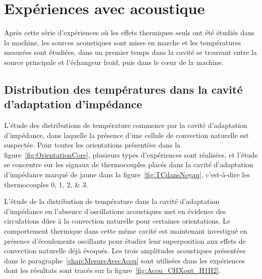 \section{Expériences avec acoustique}\label{chap:DistribTemperature}
Après cette série d'expériences où les effets thermiques seuls ont été étudiés dans la machine, les sources acoustiques sont mises en marche et les températures mesurées sont étudiées, dans un premier temps dans la cavité se trouvant entre la source principale et l'échangeur froid, puis dans le c\oe{}ur de la machine.

\subsection{Distribution des températures dans la cavité d'adaptation d'impédance}\label{chap:DistribTemp_CavAdaptImped}
L'étude des distributions de température commence par la cavité d'adaptation d'impédance, dans laquelle la présence d'une cellule de convection naturelle est suspectée. Pour toutes les orientations présentées dans la figure~\ref{fig:OrientationCore}, plusieurs types d'expériences sont réalisées, et l'étude se concentre sur les signaux de thermocouples placés dans la cavité d'adaptation d'impédance marqué de jaune dans la figure~\ref{fig:TCdansNoyau}, c'est-à-dire les thermocouples \numlist{0;1;2;3}. 




L'étude de la distribution de température dans la cavité d'adaptation d'impédance en l'absence d'oscillations acoustiques met en évidence des circulations dûes à la convection naturelle pour certaines orientations. Le comportement thermique dans cette même cavité est maintenant investigué en présence d'écoulements oscillants pour étudier leur superposition aux effets de convection naturelle déjà évoqués. Les trois amplitudes acoustiques présentées dans le paragraphe~\ref{chap:MesureAvecAcou} sont utilisées dans les expériences dont les résultats sont tracés sur la figure~\ref{fig:Acou_CHXout_H1H2}.

%
%

